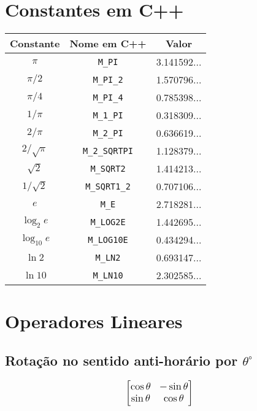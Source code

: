 \section{Constantes em C++}

\begin{center}
\begin{tabular}{|c|c|c|}
  \hline
  Constante & Nome em C++ & Valor \\
  \hline
  $\pi$ & \texttt{M\_PI} & 3.141592... \\
  \hline
  $\pi / 2$ & \texttt{M\_PI\_2} & 1.570796... \\
  \hline
  $\pi / 4$ & \texttt{M\_PI\_4} & 0.785398... \\
  \hline
  $1 / \pi$ & \texttt{M\_1\_PI} & 0.318309... \\
  \hline
  $2 / \pi$ & \texttt{M\_2\_PI} & 0.636619... \\
  \hline
  $2 / \sqrt{\pi}$ & \texttt{M\_2\_SQRTPI} & 1.128379... \\
  \hline
  $\sqrt{2}$ & \texttt{M\_SQRT2} & 1.414213... \\
  \hline
  $1 / \sqrt{2}$ & \texttt{M\_SQRT1\_2} & 0.707106... \\
  \hline
  $e$ & \texttt{M\_E} & 2.718281... \\
  \hline
  $\log_2{e}$ & \texttt{M\_LOG2E} & 1.442695... \\
  \hline
  $\log_{10}{e}$ & \texttt{M\_LOG10E} & 0.434294... \\
  \hline
  $\ln{2}$ & \texttt{M\_LN2} & 0.693147... \\
  \hline
  $\ln{10}$ & \texttt{M\_LN10} & 2.302585... \\
  \hline
\end{tabular}
\end{center}

\section{Operadores Lineares}

\subsection{Rotação no sentido anti-horário por $\theta ^\circ$}
\begin{equation*} 
\large{
\begin{bmatrix}
    \cos \theta & -\sin \theta \\
    \sin \theta & \cos \theta
\end{bmatrix}
}
\end{equation*}

